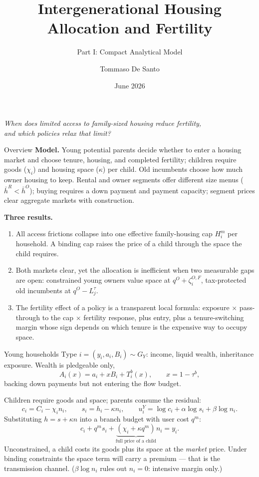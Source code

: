 \documentclass[11pt,aspectratio=169]{beamer}
\title{Intergenerational Housing Allocation and Fertility}
\subtitle{Part I: Compact Analytical Model}
\author{Tommaso De Santo}
\date{June 2026}
\newcommand{\1}{\mathbf 1}
\begin{document}
\begin{frame}
\titlepage
\vspace{-1.2em}
\begin{center}
\small
\textit{When does limited access to family-sized housing reduce fertility,\\ and which policies relax that limit?}
\end{center}
\end{frame}

\begin{frame}{Overview}
\small
\textbf{Model.} Young potential parents decide whether to enter a housing market and choose tenure, housing, and completed fertility; children require goods ($\chi_i$) and housing space ($\kappa$) per child. Old incumbents choose how much owner housing to keep. Rental and owner segments offer different size menus ($\bar h^R<\bar h^O$); buying requires a down payment and payment capacity; segment prices clear aggregate markets with construction.

\medskip
\textbf{Three results.}
\begin{enumerate}\setlength{\itemsep}{0.45em}
  \item All access frictions collapse into one effective family-housing cap $H_i^m$ per household. A binding cap raises the price of a child through the space the child requires.
  \item Both markets clear, yet the allocation is inefficient when two measurable gaps are open: constrained young owners value space at $q^O+\zeta_i^{O,F}$, tax-protected old incumbents at $q^O-L_j^\tau$.
  \item The fertility effect of a policy is a transparent local formula: exposure $\times$ pass-through to the cap $\times$ fertility response, plus entry, plus a tenure-switching margin whose sign depends on which tenure is the expensive way to occupy space.
\end{enumerate}
\end{frame}

\begin{frame}{Young households}
\small
Type $i=(y_i,a_i,B_i)\sim G_Y$: income, liquid wealth, inheritance exposure. Wealth is pledgeable only,
\[
A_i(x)=a_i+xB_i+T_i^b(x),
\qquad x=1-\tau^b,
\]
backing down payments but not entering the flow budget.

\medskip
Children require goods and space; parents consume the residual:
\[
c_i=C_i-\chi_i n_i,
\qquad
s_i=h_i-\kappa n_i,
\qquad
u_i^Y=\log c_i+\alpha\log s_i+\beta\log n_i .
\]
Substituting $h=s+\kappa n$ into a branch budget with user cost $q^m$:
\[
c_i+q^m s_i+\underbrace{(\chi_i+\kappa q^m)}_{\text{full price of a child}}n_i=y_i .
\]
\smallskip
Unconstrained, a child costs its goods plus its space at the \emph{market} price. Under binding constraints the space term will carry a premium --- that is the transmission channel. ($\beta\log n_i$ rules out $n_i=0$: intensive margin only.)
\end{frame}
\end{document}
